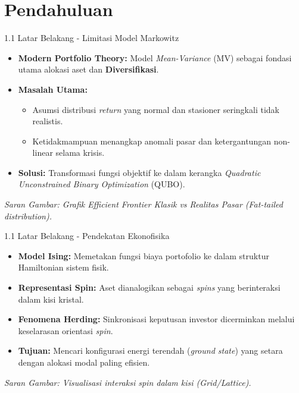 \section{Pendahuluan}

\begin{frame}{1.1 Latar Belakang - Limitasi Model Markowitz}
    \begin{itemize}
        \item \textbf{Modern Portfolio Theory:} Model \textit{Mean-Variance} (MV) sebagai fondasi utama alokasi aset dan \textbf{Diversifikasi}.
        \item \textbf{Masalah Utama:}
        \begin{itemize}
            \item Asumsi distribusi \textit{return} yang normal dan stasioner seringkali tidak realistis.
            \item Ketidakmampuan menangkap anomali pasar dan ketergantungan non-linear selama krisis.
        \end{itemize}
        \item \textbf{Solusi:} Transformasi fungsi objektif ke dalam kerangka \textit{Quadratic Unconstrained Binary Optimization} (QUBO).
    \end{itemize}
    \begin{center}
        \textit{Saran Gambar: Grafik Efficient Frontier Klasik vs Realitas Pasar (Fat-tailed distribution).}
    \end{center}
\end{frame}

\begin{frame}{1.1 Latar Belakang - Pendekatan Ekonofisika}
    \begin{itemize}
        \item \textbf{Model Ising:} Memetakan fungsi biaya portofolio ke dalam struktur Hamiltonian sistem fisik.
        \item \textbf{Representasi Spin:} Aset dianalogikan sebagai \textit{spins} yang berinteraksi dalam kisi kristal.
        \item \textbf{Fenomena Herding:} Sinkronisasi keputusan investor dicerminkan melalui keselarasan orientasi \textit{spin}.
        \item \textbf{Tujuan:} Mencari konfigurasi energi terendah (\textit{ground state}) yang setara dengan alokasi modal paling efisien.
    \end{itemize}
    \begin{center}
        \textit{Saran Gambar: Visualisasi interaksi spin dalam kisi (Grid/Lattice).}
    \end{center}
\end{frame}

